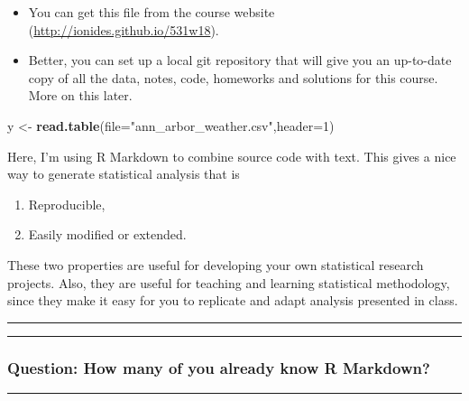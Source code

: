 \documentclass[]{article}
\newenvironment{Shaded}{\begin{snugshade}}{\end{snugshade}}
\newcommand{\KeywordTok}[1]{\textcolor[rgb]{0.13,0.29,0.53}{\textbf{#1}}}
\newcommand{\DataTypeTok}[1]{\textcolor[rgb]{0.13,0.29,0.53}{#1}}
\newcommand{\DecValTok}[1]{\textcolor[rgb]{0.00,0.00,0.81}{#1}}
\newcommand{\StringTok}[1]{\textcolor[rgb]{0.31,0.60,0.02}{#1}}
\newcommand{\NormalTok}[1]{#1}
\begin{document}
\begin{itemize}
\item
  You can get this file from the course website
  (\url{http://ionides.github.io/531w18}).
\item
  Better, you can set up a local git repository that will give you an
  up-to-date copy of all the data, notes, code, homeworks and solutions
  for this course. More on this later.
\end{itemize}

\begin{Shaded}
\begin{Highlighting}[]
\NormalTok{y <-}\StringTok{ }\KeywordTok{read.table}\NormalTok{(}\DataTypeTok{file=}\StringTok{"ann_arbor_weather.csv"}\NormalTok{,}\DataTypeTok{header=}\DecValTok{1}\NormalTok{)}
\end{Highlighting}
\end{Shaded}

Here, I'm using R Markdown to combine source code with text. This gives
a nice way to generate statistical analysis that is

\begin{enumerate}
\def\labelenumi{\arabic{enumi}.}
\item
  Reproducible,
\item
  Easily modified or extended.
\end{enumerate}

These two properties are useful for developing your own statistical
research projects. Also, they are useful for teaching and learning
statistical methodology, since they make it easy for you to replicate
and adapt analysis presented in class.

\begin{center}\rule{0.5\linewidth}{\linethickness}\end{center}

\begin{center}\rule{0.5\linewidth}{\linethickness}\end{center}

\subsubsection{Question: How many of you already know R
Markdown?}\label{question-how-many-of-you-already-know-r-markdown}

\begin{center}\rule{0.5\linewidth}{\linethickness}\end{center}
\end{document}
